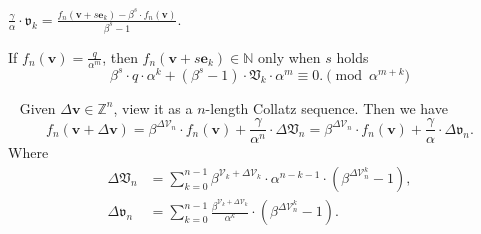 \begin{proposition}
$\frac{\gamma}{\alpha}\cdot\mathfrak{v}_{k} = \frac{f_{n}(\bm{v}+s\bm{e}_{k}) - \beta^{s}\cdot f_{n}(\bm{v})}{\beta^{s} - 1}$.
\end{proposition}
\begin{proposition}
    If $f_{n}(\bm{v}) = \frac{q}{\alpha^{m}}$, then $f_{n}(\bm{v}+s\bm{e}_{k}) \in \mathbb{N}$ only when $s$ holds
    \[ \beta^{s}\cdot q\cdot \alpha^{k} + (\beta^{s} - 1) \cdot \mathfrak{V}_{k}\cdot \alpha^{m} \equiv 0. \pmod{\alpha^{m+k}} \]
\end{proposition}
\begin{theorem}~\label{thm:vary-rule}
Given $\Delta\bm{v} \in \mathbb{Z}^{n}$, view it as a $n$-length Collatz sequence. Then we have
\[ f_{n}(\bm{v} + \Delta\bm{v}) = \beta^{\Delta\mathcal{V}_{n}}\cdot f_{n}(\bm{v}) + \frac{\gamma}{\alpha^{n}} \cdot \Delta\mathfrak{V}_{n} = \beta^{\Delta\mathcal{V}_{n}}\cdot f_{n}(\bm{v}) + \frac{\gamma}{\alpha} \cdot \Delta\mathfrak{v}_{n}. \]
Where
\begin{align*}
    \Delta\mathfrak{V}_{n} &= \sum_{k=0}^{n-1}\beta^{\mathcal{V}_{k} + \Delta\mathcal{V}_{k}}\cdot\alpha^{n-k-1}\cdot(\beta^{\Delta\mathcal{V}_{n}^{k}} - 1),\\
    \Delta\mathfrak{v}_{n} &= \sum_{k=0}^{n-1}\frac{\beta^{\mathcal{V}_{k} + \Delta\mathcal{V}_{k}}}{\alpha^{k}}\cdot(\beta^{\Delta\mathcal{V}_{n}^{k}} - 1).
\end{align*}
\end{theorem}
